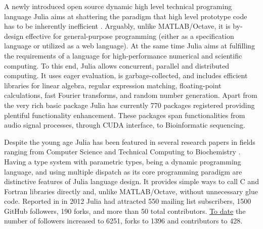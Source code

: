 A newly introduced open source dynamic high level technical programing language Julia aims at shattering the paradigm that high level prototype code has to be inherently inefficient \cite{bezanson2012julia, bezanson2014julia}. Arguably, unlike MATLAB/Octave, it is by-design effective for general-purpose programming (either as a specification language or utilized as a web language). At the same time Julia aims at fulfilling the requirements of a language for high-performance numerical and scientific computing.  To this end, Julia allows concurrent, parallel and distributed computing. It uses eager evaluation, is garbage-collected, and includes efficient libraries for linear algebra, regular expression matching, floating-point calculations, fast Fourier transforms, and random number generation. Apart from the very rich basic package Julia has currently 770 packages registered providing plentiful functionality enhancement. These packages span functionalities from audio signal processes, through CUDA interface, to Bioinformatic sequencing.

Despite the young age Julia has been featured in several research papers in fields ranging from Computer Science and Technical Computing \cite{Heitzinger_2014, Knopp_2014, Foulds_2013} to Biochemistry \cite{Baldassi_2014}. Having a type system with parametric types, being a dynamic programming language, and using multiple dispatch as its core programming paradigm are distinctive features of Julia language design. It provides simple ways to call C and Fortran libraries directly and, unlike MATLAB/Octave, without unnecessary glue code. Reported in \cite{bezanson2012julia} in 2012 Julia had attracted 550 mailing list subscribers, 1500 GitHub followers, 190 forks, and more than 50 total contributors. \href{https://github.com/JuliaLang/julia}{To date} the number of followers increased to 6251, forks to 1396 and contributors to 428. 

